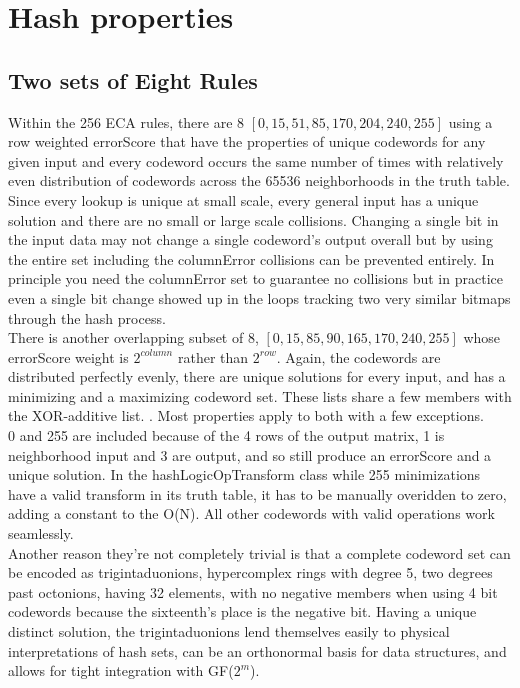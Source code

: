 \documentclass[11pt]{article}
\begin{document}
\section{Hash properties}



\subsection{Two sets of Eight Rules}
Within the 256 ECA rules, there are 8 $[0,15,51,85,170,204,240,255]$ using a row weighted errorScore that have the properties of unique codewords for any given input and every codeword occurs the same number of times with relatively even distribution of codewords across the 65536 neighborhoods in the truth table.  Since every lookup is unique at small scale, every general input has a unique solution and there are no small or large scale collisions. Changing a single bit in the input data may not change a single codeword's output overall but by using the entire set including the columnError collisions can be prevented entirely. In principle you need the columnError set to guarantee no collisions but in practice even a single bit change showed up in the loops tracking two very similar bitmaps through the hash process.\\

There is another overlapping subset of 8, $[0,15,85,90,165,170,240,255]$ whose errorScore weight is $2^{column}$ rather than $2^{row}$. Again, the codewords are distributed perfectly evenly, there are unique solutions for every input, and has a minimizing and a maximizing codeword set. These lists share a few members with the XOR-additive list. \cite{xorAdditive}. Most properties apply to both with a few exceptions.\\

0 and 255 are included because of the 4 rows of the output matrix, 1 is neighborhood input and 3 are output, and so still produce an errorScore and a unique solution. In the hashLogicOpTransform class while 255 minimizations have a valid transform in its truth table, it has to be manually overidden to zero, adding a constant to the O(N). All other codewords with valid operations work seamlessly. \\

Another reason they're not completely trivial is that a complete codeword set can be encoded as trigintaduonions, hypercomplex rings with degree 5, two degrees past octonions, having 32 elements, with no negative members when using 4 bit codewords because the sixteenth's place is the negative bit. Having a unique distinct solution, the trigintaduonions lend themselves easily to physical interpretations of hash sets, can be an orthonormal basis for data structures, and allows for tight integration with GF($2^m$).  \\
\end{document}
